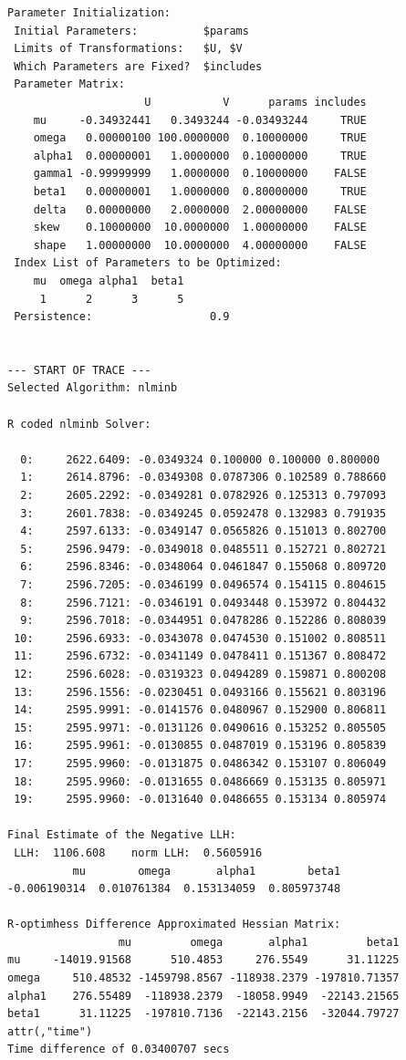 \documentclass[11pt]{article}\usepackage[]{graphicx}\usepackage[]{color}
\makeatletter
\newenvironment{kframe}{%
 \def\at@end@of@kframe{}%
 \ifinner\ifhmode%
  \def\at@end@of@kframe{\end{minipage}}%
  \begin{minipage}{\columnwidth}%
 \fi\fi%
 \def\FrameCommand##1{\hskip\@totalleftmargin \hskip-\fboxsep
 \colorbox{shadecolor}{##1}\hskip-\fboxsep
     \hskip-\linewidth \hskip-\@totalleftmargin \hskip\columnwidth}%
 \MakeFramed {\advance\hsize-\width
   \@totalleftmargin\z@ \linewidth\hsize
   \@setminipage}}%
 {\par\unskip\endMakeFramed%
 \at@end@of@kframe}
\newenvironment{knitrout}{}{} %
\makeatother
\begin{document}
\begin{knitrout}
\begin{kframe}
\begin{verbatim}
Parameter Initialization:
 Initial Parameters:          $params
 Limits of Transformations:   $U, $V
 Which Parameters are Fixed?  $includes
 Parameter Matrix:
                     U           V      params includes
    mu     -0.34932441   0.3493244 -0.03493244     TRUE
    omega   0.00000100 100.0000000  0.10000000     TRUE
    alpha1  0.00000001   1.0000000  0.10000000     TRUE
    gamma1 -0.99999999   1.0000000  0.10000000    FALSE
    beta1   0.00000001   1.0000000  0.80000000     TRUE
    delta   0.00000000   2.0000000  2.00000000    FALSE
    skew    0.10000000  10.0000000  1.00000000    FALSE
    shape   1.00000000  10.0000000  4.00000000    FALSE
 Index List of Parameters to be Optimized:
    mu  omega alpha1  beta1 
     1      2      3      5 
 Persistence:                  0.9 


--- START OF TRACE ---
Selected Algorithm: nlminb 

R coded nlminb Solver: 

  0:     2622.6409: -0.0349324 0.100000 0.100000 0.800000
  1:     2614.8796: -0.0349308 0.0787306 0.102589 0.788660
  2:     2605.2292: -0.0349281 0.0782926 0.125313 0.797093
  3:     2601.7838: -0.0349245 0.0592478 0.132983 0.791935
  4:     2597.6133: -0.0349147 0.0565826 0.151013 0.802700
  5:     2596.9479: -0.0349018 0.0485511 0.152721 0.802721
  6:     2596.8346: -0.0348064 0.0461847 0.155068 0.809720
  7:     2596.7205: -0.0346199 0.0496574 0.154115 0.804615
  8:     2596.7121: -0.0346191 0.0493448 0.153972 0.804432
  9:     2596.7018: -0.0344951 0.0478286 0.152286 0.808039
 10:     2596.6933: -0.0343078 0.0474530 0.151002 0.808511
 11:     2596.6732: -0.0341149 0.0478411 0.151367 0.808472
 12:     2596.6028: -0.0319323 0.0494289 0.159871 0.800208
 13:     2596.1556: -0.0230451 0.0493166 0.155621 0.803196
 14:     2595.9991: -0.0141576 0.0480967 0.152900 0.806811
 15:     2595.9971: -0.0131126 0.0490616 0.153252 0.805505
 16:     2595.9961: -0.0130855 0.0487019 0.153196 0.805839
 17:     2595.9960: -0.0131875 0.0486342 0.153107 0.806049
 18:     2595.9960: -0.0131655 0.0486669 0.153135 0.805971
 19:     2595.9960: -0.0131640 0.0486655 0.153134 0.805974

Final Estimate of the Negative LLH:
 LLH:  1106.608    norm LLH:  0.5605916 
          mu        omega       alpha1        beta1 
-0.006190314  0.010761384  0.153134059  0.805973748 

R-optimhess Difference Approximated Hessian Matrix:
                 mu         omega       alpha1         beta1
mu     -14019.91568      510.4853     276.5549      31.11225
omega     510.48532 -1459798.8567 -118938.2379 -197810.71357
alpha1    276.55489  -118938.2379  -18058.9949  -22143.21565
beta1      31.11225  -197810.7136  -22143.2156  -32044.79727
attr(,"time")
Time difference of 0.03400707 secs


\end{verbatim}
\end{kframe}
\end{knitrout}
\end{document}
